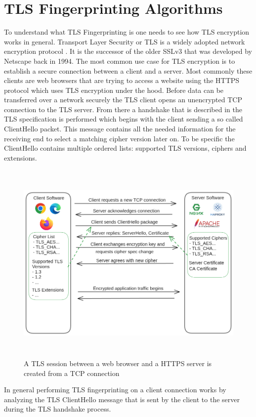 \documentclass[12pt]{scrbook}
\begin{document}
\section{TLS Fingerprinting Algorithms}
To understand what TLS Fingerprinting is one needs to see how TLS
encryption works in general. Transport Layer Security or TLS is a widely
adopted network encryption protocol . It is the successor of the older SSLv3
that was developed by Netscape back in 1994. The most common use case
for TLS encryption is to establish a secure connection between a client and
a server. Most commonly these clients are web browsers that are trying to
access a website using the HTTPS protocol which uses TLS encryption under
the hood. Before data can be transferred over a network securely the TLS
client opens an unencrypted TCP connection to the TLS server.
From there a handshake that is described in the TLS specification is performed which begins with the client sending
a so called ClientHello packet. This message contains all the needed information
for the receiving end to select a matching cipher version later on. To be specific the
ClientHello contains multiple ordered lists: supported TLS versions, ciphers and extensions.

\begin{figure}[!htb]
    \centering
    \includegraphics[height=10cm]{./images/tls_session.png}
    \caption{A TLS session between a web browser and a HTTPS server is created from a TCP connection}
\end{figure}

In general performing TLS fingerprinting on a client connection works by
analyzing the TLS ClientHello message that is sent by the client to the server
during the TLS handshake process.
\end{document}
